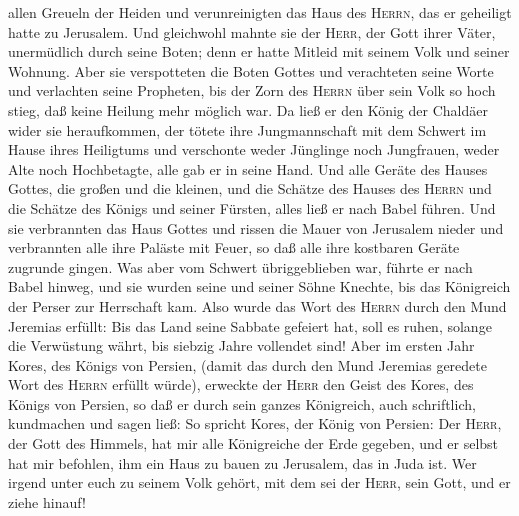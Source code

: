 allen Greueln der Heiden und verunreinigten das Haus des \textsc{Herrn},
das er geheiligt hatte zu Jerusalem.  Und gleichwohl
mahnte sie der \textsc{Herr}, der Gott ihrer Väter, unermüdlich durch
seine Boten; denn er hatte Mitleid mit seinem Volk und seiner Wohnung.
 Aber sie verspotteten die Boten Gottes und verachteten
seine Worte und verlachten seine Propheten, bis der Zorn des
\textsc{Herrn} über sein Volk so hoch stieg, daß keine Heilung mehr
möglich war.  Da ließ er den König der Chaldäer wider sie
heraufkommen, der tötete ihre Jungmannschaft mit dem Schwert im Hause
ihres Heiligtums und verschonte weder Jünglinge noch Jungfrauen, weder
Alte noch Hochbetagte, alle gab er in seine Hand.  Und
alle Geräte des Hauses Gottes, die großen und die kleinen, und die
Schätze des Hauses des \textsc{Herrn} und die Schätze des Königs und
seiner Fürsten, alles ließ er nach Babel führen.  Und sie
verbrannten das Haus Gottes und rissen die Mauer von Jerusalem nieder
und verbrannten alle ihre Paläste mit Feuer, so daß alle ihre kostbaren
Geräte zugrunde gingen.  Was aber vom Schwert
übriggeblieben war, führte er nach Babel hinweg, und sie wurden seine
und seiner Söhne Knechte, bis das Königreich der Perser zur Herrschaft
kam.  Also wurde das Wort des \textsc{Herrn} durch den
Mund Jeremias erfüllt: Bis das Land seine Sabbate gefeiert hat, soll es
ruhen, solange die Verwüstung währt, bis siebzig Jahre vollendet sind!
 Aber im ersten Jahr Kores, des Königs von Persien,
(damit das durch den Mund Jeremias geredete Wort des \textsc{Herrn}
erfüllt würde), erweckte der \textsc{Herr} den Geist des Kores, des
Königs von Persien, so daß er durch sein ganzes Königreich, auch
schriftlich, kundmachen und sagen ließ:  So spricht
Kores, der König von Persien: Der \textsc{Herr}, der Gott des Himmels,
hat mir alle Königreiche der Erde gegeben, und er selbst hat mir
befohlen, ihm ein Haus zu bauen zu Jerusalem, das in Juda ist. Wer
irgend unter euch zu seinem Volk gehört, mit dem sei der \textsc{Herr},
sein Gott, und er ziehe hinauf!
